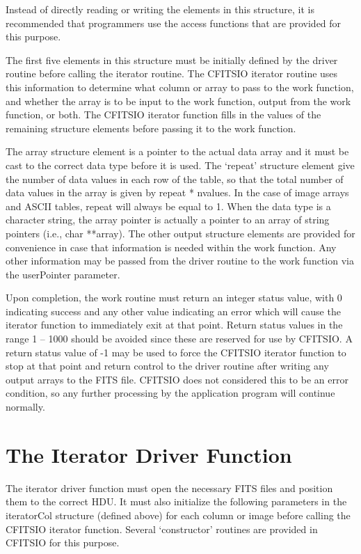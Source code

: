 \documentclass[11pt]{book}
\begin{document}
Instead of directly reading or writing the elements in this structure,
it is recommended that programmers use the access functions that are
provided for this purpose.

The first five elements in this structure must be initially defined by
the driver routine before calling the iterator routine.  The CFITSIO
iterator routine uses this information to determine what column or
array to pass to the work function, and whether the array is to be
input to the work function, output from the work function, or both.
The CFITSIO iterator function fills in the values of the remaining
structure elements before passing it to the work function.

The array structure element is a pointer to the actual data array and
it must be cast to the correct data type before it is used.  The
`repeat' structure element give the number of data values in each row
of the table, so that the total number of data values in the array is
given by repeat * nvalues.  In the case of image arrays and ASCII
tables, repeat will always be equal to 1.  When the data type is a
character string, the array pointer is actually a pointer to an array
of string pointers (i.e., char **array).  The other output structure
elements are provided for convenience in case that information is
needed within the work function.  Any other information may be passed
from the driver routine to the work function via the userPointer
parameter.

Upon completion, the work routine must return an integer status value,
with 0 indicating success and any other value indicating an error which
will cause the iterator function to immediately exit at that point.  Return status
values in the range 1 -- 1000 should be avoided since these are
reserved for use by CFITSIO.  A return status value of -1 may be used to
force the CFITSIO iterator function to stop at that point and return
control to the driver routine after writing any output arrays to the
FITS file.  CFITSIO does not considered this to be an error condition,
so any further processing by the application program will continue normally.


\section{The Iterator Driver Function}

The iterator driver function must open the necessary FITS files and
position them to the correct HDU.  It must also initialize the following
parameters in the iteratorCol structure (defined above) for each
column or image before calling the CFITSIO iterator function.
Several `constructor' routines are provided in CFITSIO for this
purpose.
\end{document}
